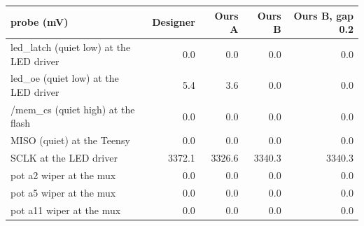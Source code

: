 \begin{tabular}{p{5.6cm}rrrr}
\toprule
probe (mV) & Designer & Ours A & Ours B & Ours B, gap 0.2 \\
\midrule
led\_latch (quiet low) at the LED driver & 0.0 & 0.0 & 0.0 & 0.0 \\
led\_oe (quiet low) at the LED driver & 5.4 & 3.6 & 0.0 & 0.0 \\
/mem\_cs (quiet high) at the flash & 0.0 & 0.0 & 0.0 & 0.0 \\
MISO (quiet) at the Teensy & 0.0 & 0.0 & 0.0 & 0.0 \\
SCLK at the LED driver & 3372.1 & 3326.6 & 3340.3 & 3340.3 \\
pot a2 wiper at the mux & 0.0 & 0.0 & 0.0 & 0.0 \\
pot a5 wiper at the mux & 0.0 & 0.0 & 0.0 & 0.0 \\
pot a11 wiper at the mux & 0.0 & 0.0 & 0.0 & 0.0 \\
\bottomrule
\end{tabular}

